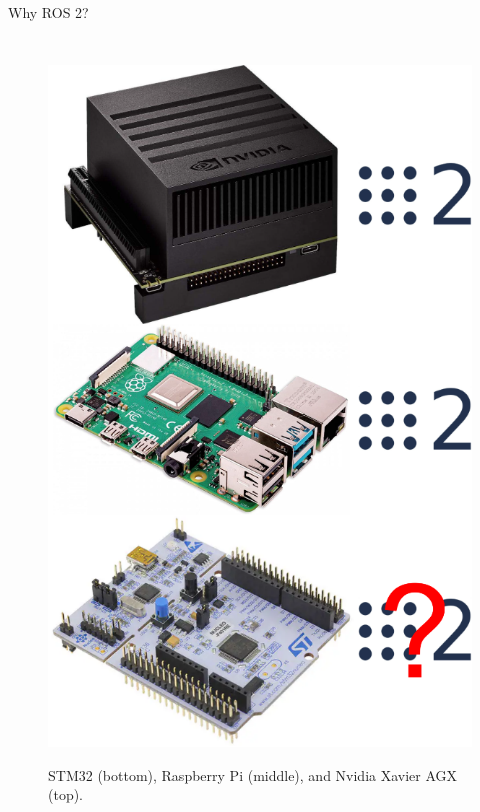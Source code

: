 \begin{frame}{Why ROS 2?}
\begin{columns}
		\begin{figure}
			\centering
			\includegraphics[scale=.17]{why_ros2.png}
			\label{fig:whyros2}
			\caption{STM32 (bottom), Raspberry Pi (middle), and Nvidia Xavier AGX (top).}
		\end{figure}
	\end{columns}
\end{frame}

